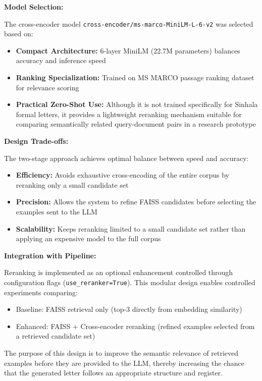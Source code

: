 \documentclass[12pt]{uomthesis}
\begin{document}
\textbf{Model Selection:}

The cross-encoder model \texttt{cross-encoder/ms-marco-MiniLM-L-6-v2} was selected based on:
\begin{itemize}
    \item \textbf{Compact Architecture:} 6-layer MiniLM (22.7M parameters) balances accuracy and inference speed
    \item \textbf{Ranking Specialization:} Trained on MS MARCO passage ranking dataset for relevance scoring
    \item \textbf{Practical Zero-Shot Use:} Although it is not trained specifically for Sinhala formal letters, it provides a lightweight reranking mechanism suitable for comparing semantically related query-document pairs in a research prototype
\end{itemize}

\textbf{Design Trade-offs:}

The two-stage approach achieves optimal balance between speed and accuracy:
\begin{itemize}
    \item \textbf{Efficiency:} Avoids exhaustive cross-encoding of the entire corpus by reranking only a small candidate set
    \item \textbf{Precision:} Allows the system to refine FAISS candidates before selecting the examples sent to the LLM
    \item \textbf{Scalability:} Keeps reranking limited to a small candidate set rather than applying an expensive model to the full corpus
\end{itemize}

\textbf{Integration with Pipeline:}

Reranking is implemented as an optional enhancement controlled through configuration flags (\texttt{use\_reranker=True}). This modular design enables controlled experiments comparing:
\begin{itemize}
    \item Baseline: FAISS retrieval only (top-3 directly from embedding similarity)
    \item Enhanced: FAISS + Cross-encoder reranking (refined examples selected from a retrieved candidate set)
\end{itemize}

The purpose of this design is to improve the semantic relevance of retrieved examples before they are provided to the LLM, thereby increasing the chance that the generated letter follows an appropriate structure and register.
\end{document}
